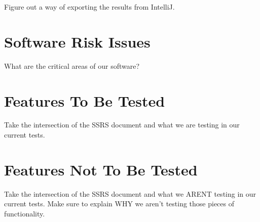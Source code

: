 \documentclass[14pt, a4paper]{article}
\begin{document}
Figure out a way of exporting the results from IntelliJ.

\newpage
\section{Software Risk Issues}

What are the critical areas of our software?


\newpage
\section{Features To Be Tested}

Take the intersection of the SSRS document and what we are testing in our current tests.

\newpage
\section{Features Not To Be Tested}


Take the intersection of the SSRS document and what we ARENT testing in our current tests. Make sure to explain WHY we aren't testing those pieces of functionality.
\end{document}

